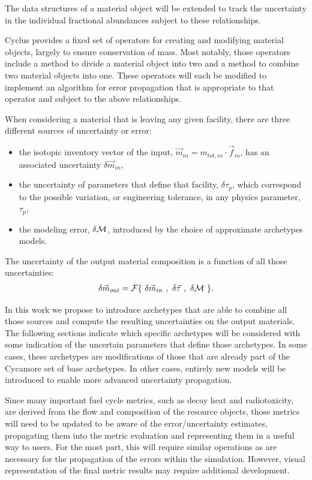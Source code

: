 \documentclass[dvips,11pt]{article}
\newcommand{\unc}[1]
{ \delta #1 }
\begin{document}
The data structures of a material object will be
extended to track the uncertainty in the
individual fractional abundances subject to these
relationships.

Cyclus provides a fixed set of operators for
creating and modifying material objects, largely
to ensure conservation of mass.  Most notably,
those operators include a method to divide a
material object into two and a method to combine
two material objects into one.  These operators
will each be modified to implement an algorithm
for error propagation that is appropriate to that
operator and subject to the above relationships.

When considering a material that is leaving any
given facility, there are three different sources
of uncertainty or error:
\begin{itemize}[nosep]
\item the isotopic inventory vector of the input,
  $\vec{m}_{in} = m_{tot,in} \cdot \vec{f}_{in}$,
  has an associated uncertainty $\unc{\vec{m}_{in}}$,
\item the uncertainty of parameters that define
that facility, $\unc{\tau_p}$, which correspond to
the possible  variation, or engineering tolerance,
in any physics parameter, $\tau_p$,
\item the modeling error, $\unc{{\cal M}}$,
introduced by the choice of approximate archetypes
models.
\end{itemize}
The uncertainty of the output material composition
is a function of all those uncertainties:
\begin{align}
  \delta \vec{m}_{out} = 
         {\cal F}\{~\unc{\vec{m}_{in}}~,~\unc{\vec{\tau}}~,~\unc{{\cal M}}~\}.
\end{align}

In this work we propose to introduce archetypes
that are able to combine all those sources and
compute the resulting uncertainties on the output
materials.  The following sections indicate which
specific archetypes will be considered with some
indication of the uncertain parameters that define
those archetypes.  In some cases, these archetypes
are modifications of those that are already part
of the Cycamore set of base archetypes.  In other
cases, entirely new models will be introduced to
enable more advanced uncertainty propagation.

Since many important fuel cycle metrics, such as
decay heat and radiotoxicity, are derived from the
flow and composition of the resource objects,
those metrics will need to be updated to be aware
of the error/uncertainty estimates, propagating
them into the metric evaluation and representing
them in a useful way to users.  For the most part,
this will require similar operations as are
necessary for the propagation of the errors within
the simulation.  However, visual representation of
the final metric results may require additional
development.
\end{document}

